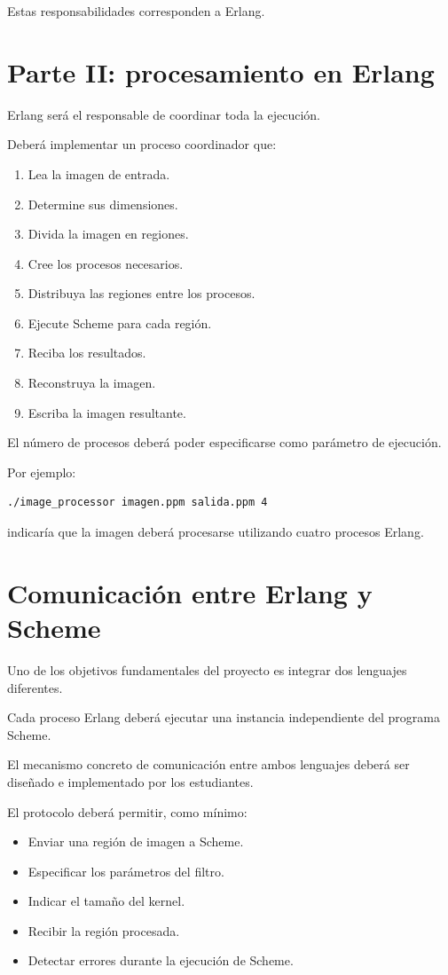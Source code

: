 \documentclass[11pt,a4paper]{article}
\begin{document}
Estas responsabilidades corresponden a Erlang.

\section{Parte II: procesamiento en Erlang}

Erlang será el responsable de coordinar toda la ejecución.

Deberá implementar un proceso coordinador que:

\begin{enumerate}
\item Lea la imagen de entrada.
\item Determine sus dimensiones.
\item Divida la imagen en regiones.
\item Cree los procesos necesarios.
\item Distribuya las regiones entre los procesos.
\item Ejecute Scheme para cada región.
\item Reciba los resultados.
\item Reconstruya la imagen.
\item Escriba la imagen resultante.
\end{enumerate}

El número de procesos deberá poder especificarse como parámetro de
ejecución.

Por ejemplo:

\begin{lstlisting}
./image_processor imagen.ppm salida.ppm 4
\end{lstlisting}

indicaría que la imagen deberá procesarse utilizando cuatro procesos
Erlang.

\section{Comunicación entre Erlang y Scheme}

Uno de los objetivos fundamentales del proyecto es integrar dos
lenguajes diferentes.

Cada proceso Erlang deberá ejecutar una instancia independiente del
programa Scheme.

El mecanismo concreto de comunicación entre ambos lenguajes deberá ser
diseñado e implementado por los estudiantes.

El protocolo deberá permitir, como mínimo:

\begin{itemize}
\item Enviar una región de imagen a Scheme.
\item Especificar los parámetros del filtro.
\item Indicar el tamaño del kernel.
\item Recibir la región procesada.
\item Detectar errores durante la ejecución de Scheme.
\end{itemize}
\end{document}
